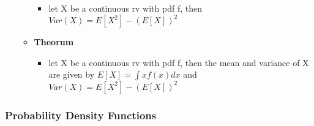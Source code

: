 \documentclass[
]{article}
\providecommand{\tightlist}{%
  \setlength{\itemsep}{0pt}\setlength{\parskip}{0pt}}
\begin{document}
\begin{itemize}
\begin{itemize}
    \begin{itemize}
    \tightlist
    \item
      let X be a continuous rv with pdf f, then
      \(Var(X) = E[X^{2}] - (E[X])^{2}\)
    \end{itemize}
  \item
    \textbf{Theorum}

    \begin{itemize}
    \tightlist
    \item
      let X be a continuous rv with pdf f, then the mean and variance of
      X are given by \(E[X] = \int xf(x)dx\) and
      \(Var(X) = E[X^{2}] - (E[X])^{2}\)
    \end{itemize}
  \end{itemize}
\end{itemize}

\hypertarget{probability-density-functions}{%
\subsubsection{Probability Density
Functions}\label{probability-density-functions}}
\end{document}
